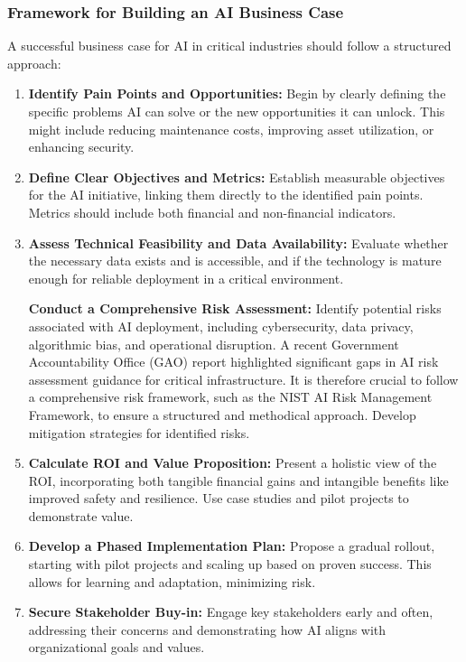 \subsubsection{Framework for Building an AI Business Case}
A successful business case for AI in critical industries should follow a structured approach:
\begin{enumerate}
    \item \textbf{Identify Pain Points and Opportunities:} Begin by clearly defining the specific problems AI can solve or the new opportunities it can unlock. This might include reducing maintenance costs, improving asset utilization, or enhancing security.
    \item \textbf{Define Clear Objectives and Metrics:} Establish measurable objectives for the AI initiative, linking them directly to the identified pain points. Metrics should include both financial and non-financial indicators.
    \item \textbf{Assess Technical Feasibility and Data Availability:} Evaluate whether the necessary data exists and is accessible, and if the technology is mature enough for reliable deployment in a critical environment.
    \item[\textbf{Conduct a Comprehensive Risk Assessment:}] Identify potential risks associated with AI deployment, including cybersecurity, data privacy, algorithmic bias, and operational disruption. A recent Government Accountability Office (GAO) report highlighted significant gaps in AI risk assessment guidance for critical infrastructure. It is therefore crucial to follow a comprehensive risk framework, such as the NIST AI Risk Management Framework, to ensure a structured and methodical approach. Develop mitigation strategies for identified risks.
    \item \textbf{Calculate ROI and Value Proposition:} Present a holistic view of the ROI, incorporating both tangible financial gains and intangible benefits like improved safety and resilience. Use case studies and pilot projects to demonstrate value.
    \item \textbf{Develop a Phased Implementation Plan:} Propose a gradual rollout, starting with pilot projects and scaling up based on proven success. This allows for learning and adaptation, minimizing risk.
    \item \textbf{Secure Stakeholder Buy-in:} Engage key stakeholders early and often, addressing their concerns and demonstrating how AI aligns with organizational goals and values.
\end{enumerate}


